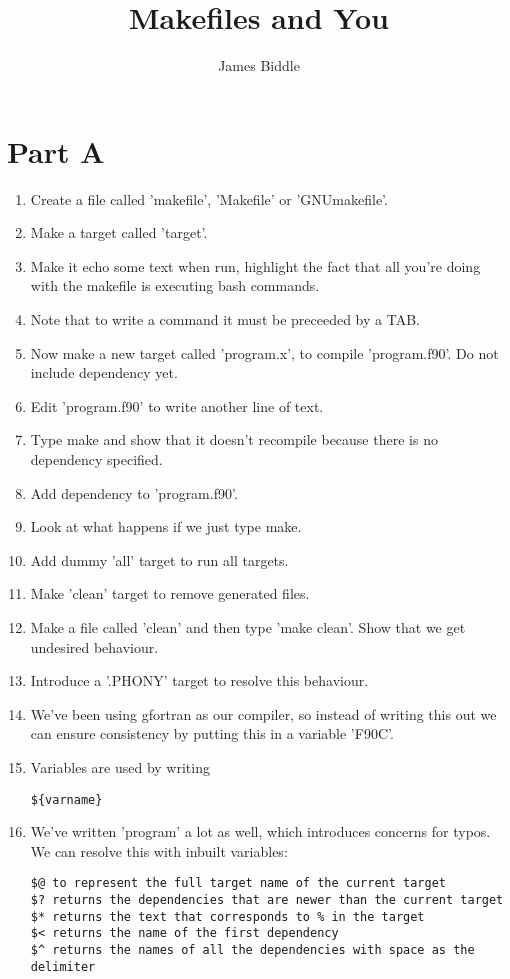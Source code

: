 \documentclass{article}
\begin{document}
\title{Makefiles and You}
\author{James Biddle}
\maketitle
\section{Part A}
\begin{enumerate}
\item Create a file called 'makefile', 'Makefile' or 'GNUmakefile'.
\item Make a target called 'target'.
\item Make it echo some text when run, highlight the fact that all you're doing with the makefile is executing bash commands.
\item Note that to write a command it must be preceeded by a TAB.
\item Now make a new target called 'program.x', to compile 'program.f90'. Do not include dependency yet.
\item Edit 'program.f90' to write another line of text.
\item Type make and show that it doesn't recompile because there is no dependency specified.
\item Add dependency to 'program.f90'.
\item Look at what happens if we just type make.
\item Add dummy 'all' target to run all targets.
\item Make 'clean' target to remove generated files.
\item Make a file called 'clean' and then type 'make clean'. Show that we get undesired behaviour.
\item Introduce a '.PHONY' target to resolve this behaviour.
\item We've been using gfortran as our compiler, so instead of writing this out we can ensure consistency by putting this in a variable 'F90C'.
\item Variables are used by writing \begin{lstlisting}
${varname}
\end{lstlisting}
\item We've written 'program' a lot as well, which introduces concerns for typos. We can resolve this with inbuilt variables:
\pagebreak
\begin{lstlisting}
$@ to represent the full target name of the current target
$? returns the dependencies that are newer than the current target
$* returns the text that corresponds to % in the target
$< returns the name of the first dependency
$^ returns the names of all the dependencies with space as the delimiter
\end{lstlisting}
 
\end{enumerate}
\end{document}
